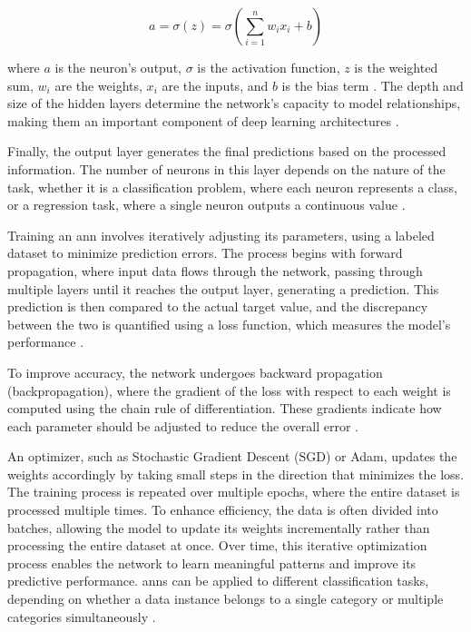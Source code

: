 \begin{equation}
  a = \sigma(z) = \sigma\left(\sum_{i=1}^{n} w_i x_i + b\right)
\end{equation}

where \(a\) is the neuron’s output, \(\sigma\) is the activation function, \(z\) is the weighted sum, \(w_i\) are the weights, \(x_i\) are the inputs, and \(b\) is the bias term \cite{neuronimage}.
The depth and size of the hidden layers determine the network's capacity to model relationships, making them an important component of deep learning architectures \cite{dongare2012introduction, sharma2024deep}.

Finally, the output layer generates the final predictions based on the processed information.
The number of neurons in this layer depends on the nature of the task, whether it is a classification problem, where each neuron represents a class, or a regression task, where a single neuron outputs a continuous value \cite{dongare2012introduction}.

Training an \ac{ann} involves iteratively adjusting its parameters, using a labeled dataset to minimize prediction errors.
The process begins with forward propagation, where input data flows through the network, passing through multiple layers until it reaches the output layer, generating a prediction.
This prediction is then compared to the actual target value, and the discrepancy between the two is quantified using a loss function, which measures the model's performance \cite{russell2016artificial}.

To improve accuracy, the network undergoes backward propagation (backpropagation), where the gradient of the loss with respect to each weight is computed using the chain rule of differentiation.
These gradients indicate how each parameter should be adjusted to reduce the overall error \cite{russell2016artificial}.

An optimizer, such as Stochastic Gradient Descent (SGD) or Adam, updates the weights accordingly by taking small steps in the direction that minimizes the loss.
The training process is repeated over multiple epochs, where the entire dataset is processed multiple times.
To enhance efficiency, the data is often divided into batches, allowing the model to update its weights incrementally rather than processing the entire dataset at once.
Over time, this iterative optimization process enables the network to learn meaningful patterns and improve its predictive performance.
\ac{ann}s can be applied to different classification tasks, depending on whether a data instance belongs to a single category or multiple categories simultaneously \cite{russell2016artificial}.

